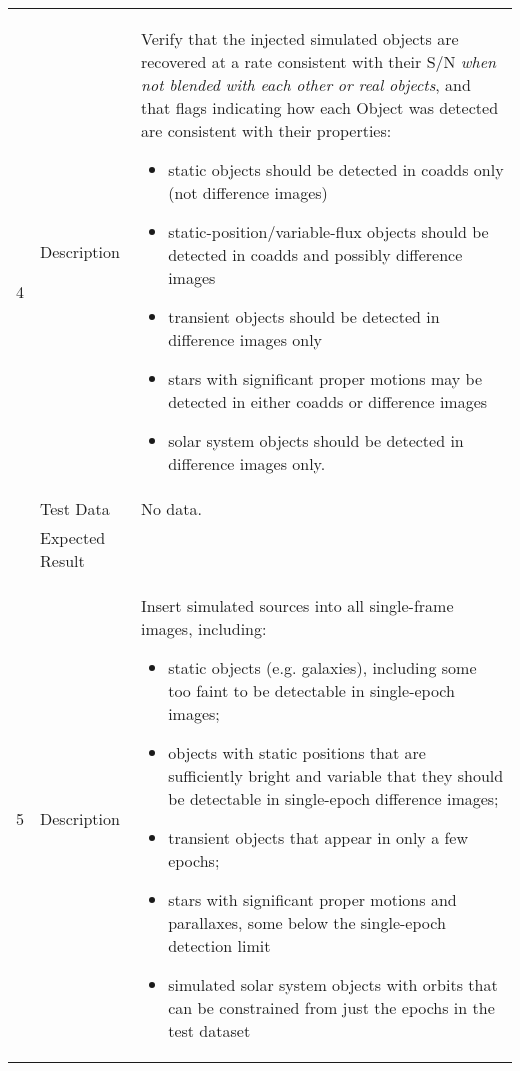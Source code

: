 \begin{longtable}[]{p{1.3cm}p{2cm}p{13cm}}
            \multirow{3}{*}{ 4 } & Description &
            \begin{minipage}[t]{13cm}{\footnotesize
            Verify that the injected simulated objects are recovered at a rate
consistent with their S/N \emph{when not blended with each other or real
objects}, and that flags indicating how each Object was detected are
consistent with their properties:

\begin{itemize}
\tightlist
\item
  static objects should be detected in coadds only (not difference
  images)
\item
  static-position/variable-flux objects should be detected in coadds and
  possibly difference images
\item
  transient objects should be detected in difference images only
\item
  stars with significant proper motions may be detected in either coadds
  or difference images
\item
  solar system objects should be detected in difference images only.
\end{itemize}

            \vspace{\dp0}
            } \end{minipage} \\ \cline{2-3}
            & Test Data &
            \begin{minipage}[t]{13cm}{\footnotesize
                No data.
                \vspace{\dp0}
            } \end{minipage} \\ \cline{2-3}
            & Expected Result &
        \\ \midrule

            \multirow{3}{*}{ 5 } & Description &
            \begin{minipage}[t]{13cm}{\footnotesize
            Insert simulated sources into all single-frame images, including:

\begin{itemize}
\tightlist
\item
  static objects (e.g. galaxies), including some too faint to be
  detectable in single-epoch images;
\item
  objects with static positions that are sufficiently bright and
  variable that they should be detectable in single-epoch difference
  images;
\item
  transient objects that appear in only a few epochs;
\item
  stars with significant proper motions and parallaxes, some below the
  single-epoch detection limit
\item
  simulated solar system objects with orbits that can be constrained
  from just the epochs in the test dataset
\end{itemize}

}
\end{minipage}
\end{longtable}
